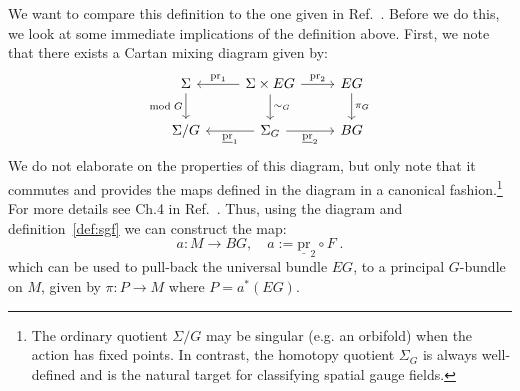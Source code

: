 \documentclass[aps,prx,reprint,superscriptaddress,twocolumn,amsmath,amssymb,amsfonts, nofootinbib]{revtex4-2}
\theoremstyle{apsstyle}
\begin{document}
\noindent We want to compare this definition to the one given in Ref.~\cite{ThorngrenElse}. Before we do this, we look at some immediate implications of the definition above. First, we note that there exists a Cartan mixing diagram given by:
\begin{equation}
    \begin{tikzcd}
        \Sigma \arrow[d, "\mathrm{mod}\;G", swap] &\Sigma\times EG \arrow[d, "\sim_{G}"] \arrow[l, "\mathrm{pr}_{1}", swap] \arrow[r, "\mathrm{pr}_{2}"]& EG \arrow[d, "\pi_{G}"]\\
        \Sigma/G &\Sigma_{G}  \arrow[l, "\underline{\mathrm{pr}}_{1}"] \arrow[r, "\underline{\mathrm{pr}}_{2}", swap]& BG
    \end{tikzcd}
\end{equation}
We do not elaborate on the properties of this diagram, but only note that it commutes and provides the maps defined in the diagram in a canonical fashion.\footnote{The ordinary quotient $\Sigma/G$ may be singular (e.g. an orbifold) when the action has fixed points. In contrast, the homotopy quotient $\Sigma_{G}$ is always well-defined and is the natural target for classifying spatial gauge fields.} For more details see Ch.4 in Ref.~\cite{Tu2020}. Thus, using the diagram and definition~\ref{def:sgf} we can construct the map:
\begin{equation*}
    a: M \to BG, \quad a:=\underline{\mathrm{pr}}_{2} \circ F\;.
\end{equation*}
which can be used to pull-back the universal bundle $EG$, to a principal $G$-bundle on $M$, given by $\pi: P\to M$ where $P=a^{*}(EG)$. 

\bigskip 
\end{document}
